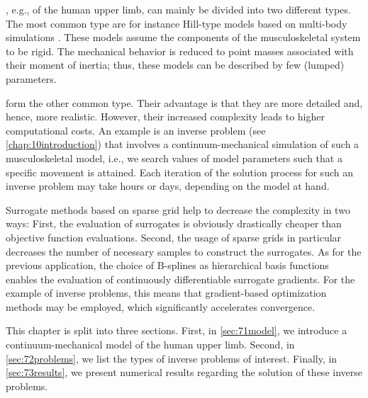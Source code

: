 
\label{chap:70muscle}

,
e.g., of the human upper limb, can mainly be divided into two different types.
The most common type are 
for instance Hill-type models based on multi-body simulations
.
These models assume the components of the musculoskeletal system
to be rigid.
The mechanical behavior is reduced to point masses
associated with their moment of inertia;
thus, these models can be described by few (lumped) parameters.

 form the other common type.
Their advantage is that they are more detailed and, hence, more realistic.
However, their increased complexity leads to higher computational costs.
An example is an inverse problem (see \cref{chap:10introduction})
that involves a continuum-mechanical simulation of such a
musculoskeletal model,
i.e., we search values of model parameters
such that a specific movement is attained.
Each iteration of the solution process for such an inverse problem
may take hours or days, depending on the model at hand.

Surrogate methods based on sparse grid help to decrease the complexity
in two ways:
First, the evaluation of surrogates is obviously drastically cheaper
than objective function evaluations.
Second, the usage of sparse grids in particular decreases the number
of necessary samples to construct the surrogates.
As for the previous application,
the choice of B-splines as hierarchical basis functions enables
the evaluation of continuously differentiable surrogate gradients.
For the example of inverse problems, this means that
gradient-based optimization methods may be employed,
which significantly accelerates convergence.

This chapter is split into three sections.
First, in \cref{sec:71model}, we introduce a continuum-mechanical
model of the human upper limb.
Second, in \cref{sec:72problems}, we list the types of inverse problems
of interest.
Finally, in \cref{sec:73results}, we present numerical results
regarding the solution of these inverse problems.


